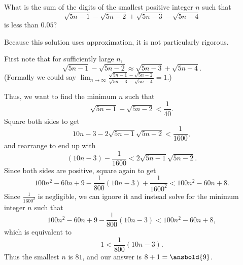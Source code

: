 \documentclass[mast]{lucky}
\begin{document}
\begin{req}[DMC 10B 2021/23]{9}
What is the sum of the digits of the smallest positive integer $n$ such that
\[\sqrt{5n-1}-\sqrt{5n-2}+\sqrt{5n-3}-\sqrt{5n-4}\]
is less than $0.05?$
\begin{solu}
Because this solution uses approximation, it is not particularly rigorous.

First note that for sufficiently large $n$,
\[\sqrt{5n-1}-\sqrt{5n-2}\approx \sqrt{5n-3}+\sqrt{5n-4}.\]
(Formally we could say $\lim_{n\to\infty}\frac{\sqrt{5n-1}-\sqrt{5n-2}}{\sqrt{5n-3}-\sqrt{5n-4}}=1.$)

Thus, we want to find the minimum $n$ such that
\[\sqrt{5n-1}-\sqrt{5n-2}<\frac{1}{40}.\]
Square both sides to get
\[10n-3-2\sqrt{5n-1}\sqrt{5n-2}<\frac{1}{1600},\]
and rearrange to end up with
\[(10n-3)-\frac{1}{1600}<2\sqrt{5n-1}\sqrt{5n-2}.\]
Since both sides are positive, square again to get
\[100n^2-60n+9-\frac{1}{800}(10n-3)+\frac{1}{1600^2}<100n^2-60n+8.\]
Since $\frac{1}{1600^2}$ is negligible, we can ignore it and instead solve for the minimum integer $n$ such that
\[100n^2-60n+9-\frac{1}{800}(10n-3)<100n^2-60n+8,\]
which is equivalent to
\[1<\frac{1}{800}(10n-3).\]
Thus the smallest $n$ is $81$, and our answer is $8+1=\ansbold{9}$.
\end{solu}
\end{req}
\end{document}
